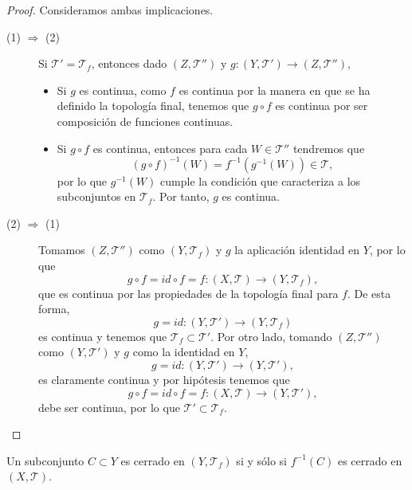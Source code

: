 \begin{proof}
Consideramos ambas implicaciones.
\begin{description}
\item[(1) $\displaystyle \Rightarrow $ (2)] Si $\displaystyle \mathcal{T}' = \mathcal{T}_{f} $, entonces dado $\displaystyle \left(Z, \mathcal{T}''\right) $ y $\displaystyle g : \left(Y, \mathcal{T}'\right)\to \left(Z, \mathcal{T}''\right) $,
	\begin{itemize}
	\item Si $\displaystyle g $ es continua, como $\displaystyle f $ es continua por la manera en que se ha definido la topología final, tenemos que $\displaystyle g\circ f $ es continua por ser composición de funciones continuas.
	\item Si $\displaystyle g\circ f $ es continua, entonces para cada $\displaystyle W \in \mathcal{T}'' $ tendremos que 
		\[\left(g\circ f\right)^{-1}\left(W\right)=f^{-1}\left(g^{-1}\left(W\right)\right)\in \mathcal{T} ,\]
		por lo que $\displaystyle g^{-1}\left(W\right) $ cumple la condición que caracteriza a los subconjuntos en $\displaystyle \mathcal{T}_{f} $. Por tanto, $\displaystyle g $ es continua.
	\end{itemize}
\item[(2) $\displaystyle \Rightarrow $ (1)] Tomamos $\displaystyle \left(Z, \mathcal{T}''\right) $ como $\displaystyle \left(Y, \mathcal{T}_{f}\right) $ y $\displaystyle g $ la aplicación identidad en $\displaystyle Y $, por lo que 
	\[g \circ f = id \circ f = f : \left(X, \mathcal{T}\right)\to \left(Y, \mathcal{T}_{f}\right) ,\]
	que es continua por las propiedades de la topología final para $\displaystyle f $. De esta forma,  
	\[g = id : \left(Y, \mathcal{T}'\right)\to \left(Y, \mathcal{T}_{f}\right) \]
	es continua y tenemos que $\displaystyle \mathcal{T}_{f}\subset \mathcal{T}' $. 
	Por otro lado, tomando $\displaystyle \left(Z, \mathcal{T}''\right) $ como $\displaystyle \left(Y, \mathcal{T}'\right) $ y $\displaystyle g $ como la identidad en $\displaystyle Y $,
	\[g = id : \left(Y, \mathcal{T}'\right)\to \left(Y, \mathcal{T}'\right) ,\]
	es claramente continua y por hipótesis tenemos que 
	\[g\circ f = id \circ f = f : \left(X, \mathcal{T}\right)\to \left(Y, \mathcal{T}'\right) ,\]
	debe ser continua, por lo que $\displaystyle \mathcal{T}' \subset \mathcal{T}_{f} $. 
\end{description}
\end{proof}

\begin{prop}
Un subconjunto $\displaystyle C \subset Y $ es cerrado en $\displaystyle \left(Y, \mathcal{T}_{f}\right) $ si y sólo si $\displaystyle f^{-1}\left(C\right) $ es cerrado en $\displaystyle \left(X, \mathcal{T}\right) $.
\end{prop}

